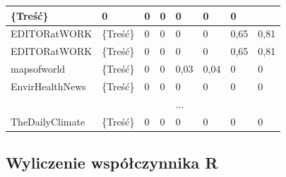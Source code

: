 \documentclass{classrep}
\begin{document}
\begin{landscape}
\begin{table}[H]
{\begin{tabular}{llllllll}
          \multicolumn{1}{l|}{\{Treść\}} &
          \multicolumn{1}{l|}{0} &
          \multicolumn{1}{l|}{0} &
          \multicolumn{1}{l|}{0} &
          \multicolumn{1}{l|}{0} &
          \multicolumn{1}{l|}{0} &
          \multicolumn{1}{l|}{0} \\ \hline
        \multicolumn{1}{|l|}{EDITORatWORK} &
          \multicolumn{1}{l|}{\{Treść\}} &
          \multicolumn{1}{l|}{0} &
          \multicolumn{1}{l|}{0} &
          \multicolumn{1}{l|}{0} &
          \multicolumn{1}{l|}{0} &
          \multicolumn{1}{l|}{0,65} &
          \multicolumn{1}{l|}{0,81} \\ \hline
        \multicolumn{1}{|l|}{EDITORatWORK} &
          \multicolumn{1}{l|}{\{Treść\}} &
          \multicolumn{1}{l|}{0} &
          \multicolumn{1}{l|}{0} &
          \multicolumn{1}{l|}{0} &
          \multicolumn{1}{l|}{0} &
          \multicolumn{1}{l|}{0,65} &
          \multicolumn{1}{l|}{0,81} \\ \hline
        \multicolumn{1}{|l|}{mapsofworld} &
          \multicolumn{1}{l|}{\{Treść\}} &
          \multicolumn{1}{l|}{0} &
          \multicolumn{1}{l|}{0} &
          \multicolumn{1}{l|}{0,03} &
          \multicolumn{1}{l|}{0,04} &
          \multicolumn{1}{l|}{0} &
          \multicolumn{1}{l|}{0} \\ \hline
        \multicolumn{1}{|l|}{EnvirHealthNews} &
          \multicolumn{1}{l|}{\{Treść\}} &
          \multicolumn{1}{l|}{0} &
          \multicolumn{1}{l|}{0} &
          \multicolumn{1}{l|}{0} &
          \multicolumn{1}{l|}{0} &
          \multicolumn{1}{l|}{0} &
          \multicolumn{1}{l|}{0} \\ \hline
         &
           &
           &
           &
          ... &
           &
           &
           \\ \hline
        \multicolumn{1}{|l|}{TheDailyClimate} &
          \multicolumn{1}{l|}{\{Treść\}} &
          \multicolumn{1}{l|}{0} &
          \multicolumn{1}{l|}{0} &
          \multicolumn{1}{l|}{0} &
          \multicolumn{1}{l|}{0} &
          \multicolumn{1}{l|}{0} &
          \multicolumn{1}{l|}{0} \\ \hline
    \end{tabular}   }
\end{table}
\vfill\mbox{}
\end{landscape}

\subsection{Wyliczenie współczynnika R}
\end{document}
